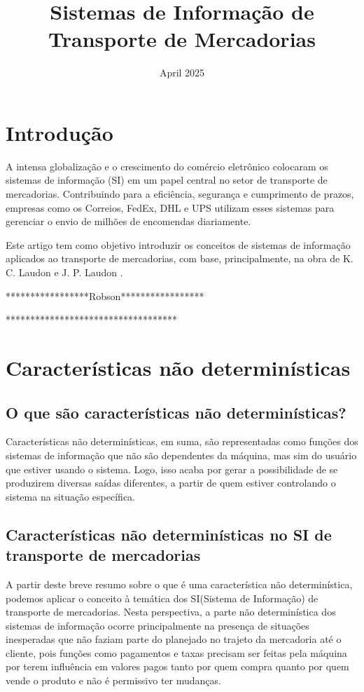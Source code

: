 \documentclass[conference]{IEEEtran}
\title{Sistemas de Informação de Transporte de Mercadorias}
\author{
\IEEEauthorblockN{Pedro Henrique L.B.T Bomfim, Robson França, Igor Nascimento}
\IEEEauthorblockA{\textit{Universidade de São Paulo}}
}
\date{April 2025}
\begin{document}
\maketitle

\section{Introdução}
A intensa globalização e o crescimento do comércio eletrônico colocaram os sistemas de informação (SI) em um papel central no setor de transporte de mercadorias. Contribuindo para a eficiência, segurança e cumprimento de prazos, empresas como os Correios, FedEx, DHL e UPS utilizam esses sistemas para gerenciar o envio de milhões de encomendas diariamente.

Este artigo tem como objetivo introduzir os conceitos de sistemas de informação aplicados ao transporte de mercadorias, com base, principalmente, na obra de K. C. Laudon e J. P. Laudon \cite{laudon2015}.

*****************Robson*****************

***********************************
\section{Características não determinísticas}
\subsection{O que são características não determinísticas?}
Características não determinísticas, em suma, são representadas como funções dos sistemas de informação que não são dependentes da máquina, mas sim do usuário que estiver usando o sistema. Logo, isso acaba por gerar a possibilidade de se produzirem diversas saídas diferentes, a partir de quem estiver controlando o sistema na situação específica.
\subsection{Características não determinísticas no SI de transporte de mercadorias}
A partir deste breve resumo sobre o que é uma característica não determinística, podemos aplicar o conceito à temática dos SI(Sistema de Informação) de transporte de mercadorias. Nesta perspectiva, a parte não determinística dos sistemas de informação ocorre principalmente na presença de situações inesperadas que não faziam parte do planejado no trajeto da mercadoria até o cliente, pois funções como pagamentos e taxas precisam ser feitas pela máquina por terem influência em valores pagos tanto por quem compra quanto por quem vende o produto e não é permissivo ter mudanças.
\end{document}
